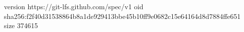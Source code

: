version https://git-lfs.github.com/spec/v1
oid sha256:f2f40d31538864b8a1de929413bbe45b10ff9e0682c15e64164d8d7884ffe651
size 374615
